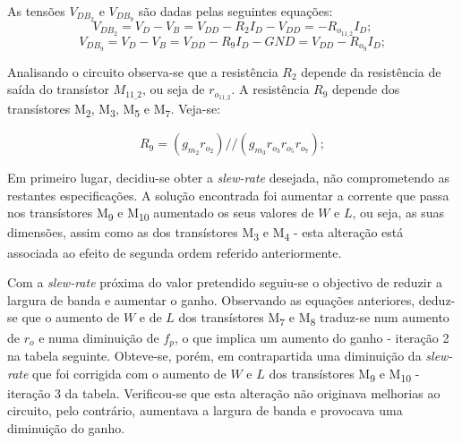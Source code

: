 \documentclass[11pt]{article}
\numberwithin{equation}{section}
\begin{document}
\vspace{3mm}

As tensões $V_{DB_2}$ e $V_{DB_9}$ são dadas pelas seguintes equações:
	\vspace{-3mm}
	\begin{equation}
	V_{DB_2} = V_D - V_B = V_{DD} - R_{2} I_D - V_{DD} = - R_{o_{11\_2}} I_D ;
	\end{equation}
	\begin{equation}
	V_{DB_9} = V_D - V_B = V_{DD} - R_{9} I_D - GND = V_{DD} - R_{o_9} I_D ;
	\end{equation}
	
\vspace{1mm}
Analisando o circuito observa-se que a resistência $R_{2}$ depende da resistência de saída do transístor  $M_{11\_2}$, ou seja de $r_{o_{11\_2}}$. A resistência $R_{9}$ depende dos transístores M\textsubscript{2}, M\textsubscript{3}, M\textsubscript{5} e M\textsubscript{7}. Veja-se:
	
\vspace{-3mm}
\begin{equation}
R_{9} = \left(g_{m_2}r_{o_2}\right)//\left(g_{m_3}r_{o_3}r_{o_5}r_{o_7}\right);
\end{equation}

Em primeiro lugar, decidiu-se obter a \textit{slew-rate} desejada, não comprometendo as restantes especificações. A solução encontrada foi aumentar a corrente que passa nos transístores M\textsubscript{9} e M\textsubscript{10} aumentado os seus valores de $W$ e $L$, ou seja, as suas dimensões, assim como as dos transístores M\textsubscript{3} e M\textsubscript{4} - esta alteração está associada ao efeito de segunda ordem referido anteriormente. 

Com a \textit{slew-rate} próxima do valor pretendido seguiu-se o objectivo de reduzir a largura de banda e aumentar o ganho. Observando as equações anteriores, deduz-se que o aumento de $W$ e de $L$ dos transístores M\textsubscript{7} e M\textsubscript{8} traduz-se num aumento de $r_o$ e numa diminuição de $f_p$, o que implica um aumento do ganho - iteração 2 na tabela seguinte. Obteve-se, porém, em contrapartida uma diminuição da \textit{slew-rate} que foi corrigida com o aumento de $W$ e $L$ dos transístores M\textsubscript{9} e M\textsubscript{10} - iteração 3 da tabela. Verificou-se que esta alteração não originava melhorias ao circuito, pelo contrário, aumentava a largura de banda e provocava uma diminuição do ganho.
\end{document}
